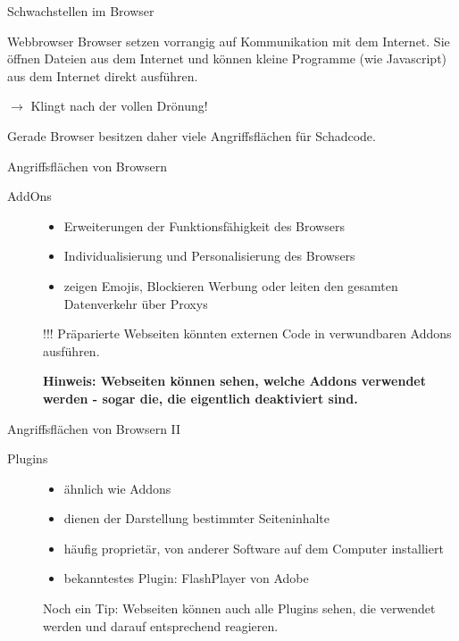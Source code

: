 \documentclass[hyperref={colorlinks,linkcolor=blue}, utf8]{beamer}
\begin{document}
	\begin{frame}{Schwachstellen im Browser}
		\begin{block}{Webbrowser}
			Browser setzen vorrangig auf Kommunikation mit dem Internet. Sie öffnen Dateien aus dem Internet und können kleine Programme (wie Javascript) aus dem Internet direkt ausführen.
		\end{block}
		
		\alert{ $\rightarrow$ Klingt nach der vollen Drönung!}
		
		Gerade Browser besitzen daher viele Angriffsflächen für Schadcode. 		
	\end{frame}

	\begin{frame}{Angriffsflächen von Browsern}
		\begin{description}
			\item[AddOns] {
				\begin{itemize}
					\item Erweiterungen der Funktionsfähigkeit des Browsers
					\item Individualisierung und Personalisierung des Browsers
					\item zeigen Emojis, Blockieren Werbung oder leiten den gesamten Datenverkehr über Proxys
				\end{itemize}
			
				\begin{alertblock}{!!!}
					Präparierte Webseiten könnten externen Code in verwundbaren Addons ausführen. 
					
					\textbf{Hinweis: Webseiten können sehen, welche Addons verwendet werden - sogar die, die eigentlich deaktiviert sind.}
				\end{alertblock}
			}
		\end{description}
	\end{frame}

	\begin{frame}{Angriffsflächen von Browsern II}
		\begin{description}
			\item[Plugins] {
				\begin{itemize}
					\item ähnlich wie Addons
					\item dienen der Darstellung bestimmter Seiteninhalte
					\item häufig proprietär, von anderer Software auf dem Computer installiert
					\item bekanntestes Plugin: FlashPlayer von Adobe					
				\end{itemize}
			
			\begin{alertblock}{Noch ein Tip:}
				Webseiten können auch alle Plugins sehen, die verwendet werden und darauf entsprechend reagieren.
			\end{alertblock}
		}
		\end{description}
	\end{frame}
	
\end{document}
